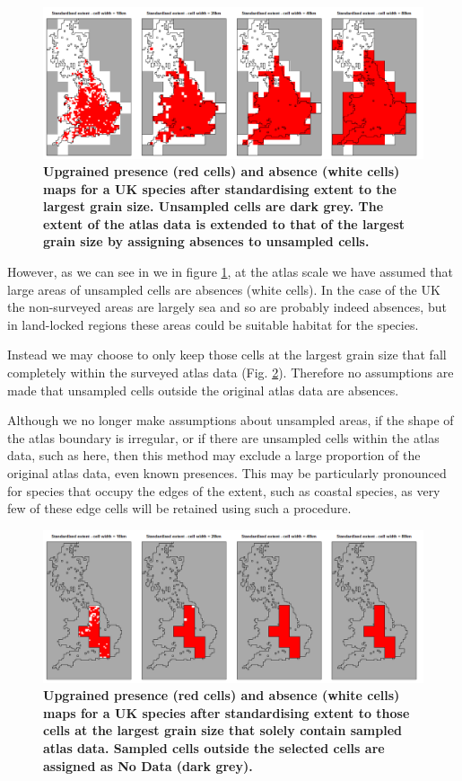 \documentclass{article}[12pt, a4paper]
\begin{document}
\begin{figure}[thb]
\centering
\includegraphics[width=\linewidth]{All_interior.png}
\caption{\textbf{Upgrained presence (red cells) and absence (white cells) maps for a UK species after standardising extent to the largest grain size. Unsampled cells are dark grey. The extent of the atlas data is extended to that of the largest grain size by assigning absences to unsampled cells.}}
\label{fig:All interior}
\end{figure}

However, as we can see in we in figure \ref{fig:All interior}, at the atlas scale we have assumed that large areas of unsampled cells are absences (white cells). In the case of the UK the non-surveyed areas are largely sea and so are probably indeed absences, but in land-locked regions these areas could be suitable habitat for the species.

Instead we may choose to only keep those cells at the largest grain size that fall completely within the surveyed atlas data (Fig. \ref{fig:Interior only}). Therefore no assumptions are made that unsampled cells outside the original atlas data are absences.

Although we no longer make assumptions about unsampled areas, if the shape of the atlas boundary is irregular, or if there are unsampled cells within the atlas data, such as here, then this method may exclude a large proportion of the original atlas data, even known presences. This may be particularly pronounced for species that occupy the edges of the extent, such as coastal species, as very few of these edge cells will be retained using such a procedure.

\begin{figure}[hbt]
\centering
\includegraphics[width=\linewidth]{Interior_only.png}
\caption{\textbf{Upgrained presence (red cells) and absence (white cells) maps for a UK species after standardising extent to those cells at the largest grain size that solely contain sampled atlas data. Sampled cells outside the selected cells are assigned as No Data (dark grey).}}
\label{fig:Interior only}
\end{figure}
\end{document}
